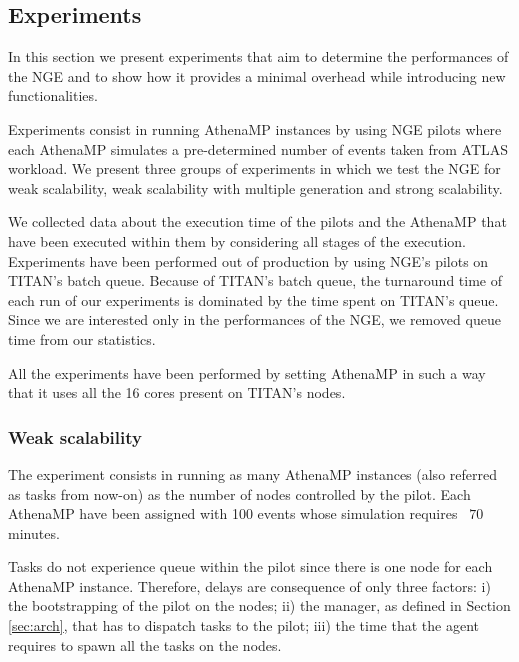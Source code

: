 
\subsection{Experiments}

In this section we present experiments that aim to determine the performances of the NGE and to show how it provides a minimal overhead while introducing new functionalities.

Experiments consist in running AthenaMP instances by using NGE pilots where each AthenaMP simulates a pre-determined number of events taken from ATLAS workload.	
We present three groups of experiments in which we test the NGE for weak scalability, weak scalability with multiple generation and strong scalability.

We collected data about the execution time of the pilots and the AthenaMP that have been executed within them by considering all stages of the execution.
Experiments have been performed out of production by using NGE's pilots on TITAN's batch queue. 
Because of TITAN's batch queue, the turnaround time of each run of our experiments is dominated by the time spent on TITAN's queue. Since we are interested only in the performances of the NGE, we removed queue time from our statistics.

All the experiments have been performed by setting AthenaMP in such a way that it uses all the 16 cores present on TITAN's nodes. 


\subsubsection{Weak scalability}

The experiment consists in running as many AthenaMP instances (also referred as tasks from now-on) as the number of nodes controlled by the pilot. Each AthenaMP have been assigned with 100 events whose simulation requires  ~$70$ minutes. 
 
Tasks do not experience queue within the pilot since there is one node for each AthenaMP instance. Therefore, delays are consequence of only three factors: i) the bootstrapping of the pilot on the nodes; ii) the manager, as defined in Section \ref{sec:arch}, that has to dispatch tasks to the pilot; iii) the time that the agent requires to spawn all the tasks on the nodes.

